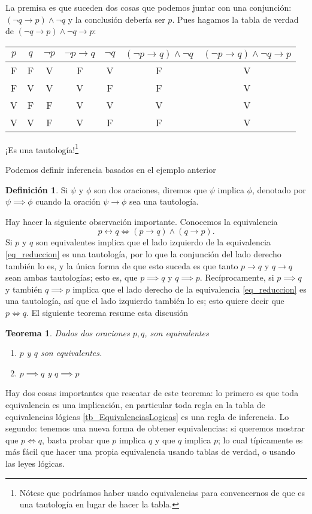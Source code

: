 \documentclass{book}
\newtheorem{thm}{Teorema}[chapter]
\theoremstyle{definition}
\newtheorem{df}{Definición}[chapter]
\begin{document}
La premisa es que suceden dos cosas que podemos juntar con una conjunción: $(\neg q \rightarrow p) \wedge \neg q$ y la conclusión debería ser $p$. Pues hagamos la tabla de verdad de $(\neg q \rightarrow p) \wedge \neg q \rightarrow p$:
\begin{center}\begin{tabular}{|c|c||c|c|c|c|c|}
	\hline
	$p$ & $q$ & $\neg p$ & $\neg p \rightarrow q$ & $\neg q$ & $(\neg p \rightarrow q)\wedge \neg q$ & $(\neg p \rightarrow q)\wedge \neg q \rightarrow p$ \\
	\hline \hline
	F&F&V&F&V&F&V\\ \hline
	F&V&V&V&F&F&V\\ \hline
	V&F&F&V&V&V&V\\ \hline
	V&V&F&V&F&F&V\\ \hline
\end{tabular}\end{center}
¡Es una tautología!\footnote{Nótese que podríamos haber usado equivalencias para convencernos de que es una tautología en lugar de hacer la tabla.}

Podemos definir inferencia basados en el ejemplo anterior
\begin{df}
	Si $\psi$ y $\phi$ son dos oraciones, diremos que $\psi$ implica $\phi$, denotado por $\psi \implies \phi$ cuando la oración $\psi \rightarrow \phi$ sea una tautología. 
\end{df}
Hay hacer la siguiente observación importante. 
Conocemos la equivalencia %
\begin{equation}\label{eq_reduccion}
	p \leftrightarrow q \iff (p \rightarrow q) \wedge (q \rightarrow p).
\end{equation}
Si $p$ y $q$ son equivalentes implica que el lado izquierdo de la equivalencia \ref{eq_reduccion} es una tautología, por lo que la conjunción del lado derecho también lo es, y la única forma de que esto suceda es que tanto $p \rightarrow q$ y $q\rightarrow q$ sean ambas tautologías; esto es, que $p\implies q$ y $q \implies p$.
Recíprocamente, si $p \implies q$ y también $q \implies p$ implica que el lado derecho de la equivalencia \ref{eq_reduccion} es una tautología, así que el lado izquierdo también lo es; esto quiere decir que $p\iff q$.
El siguiente teorema resume esta discusión
\begin{thm}
	Dados dos oraciones $p,q$, son equivalentes
	\begin{enumerate}
		\item $p$ y $q$ son equivalentes.
		\item $p \implies q$ y $q \implies p$
	\end{enumerate}
\end{thm}
Hay dos cosas importantes que rescatar de este teorema:
lo primero es que toda equivalencia es una implicación, en particular toda regla en la tabla de equivalencias lógicas \ref{tb_EquivalenciasLogicas} es una regla de inferencia.
Lo segundo: tenemos una nueva forma de obtener equivalencias: si queremos mostrar que $p \iff q$, basta probar que $p$ implica $q$ y que $q$ implica $p$; lo cual típicamente es más fácil que hacer una propia equivalencia usando tablas de verdad, o usando las leyes lógicas.
\end{document}
